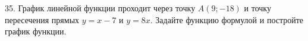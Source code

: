 35. График линейной функции проходит через точку $A(9;-18)$ и точку пересечения прямых $y=x-7$ и $y=8x.$ Задайте функцию формулой и постройте график функции.\\
